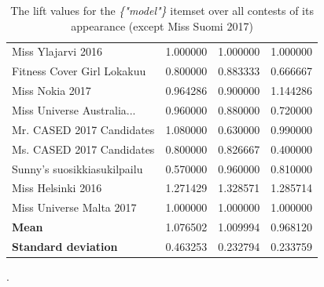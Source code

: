 \documentclass[english]{tktltiki}
\begin{document}
\begin{table}[H]
\begin{adjustbox}{width=1\textwidth}
\begin{tabular}{lccc}
                                Miss Ylajarvi 2016 &  1.000000 &  1.000000 &    1.000000 \\
                        Fitness Cover Girl Lokakuu &  0.800000 &  0.883333 &    0.666667 \\
                                   Miss Nokia 2017 &  0.964286 &  0.900000 &    1.144286 \\
                        Miss Universe Australia... &  0.960000 &  0.880000 &    0.720000 \\
                         Mr. CASED 2017 Candidates &  1.080000 &  0.630000 &    0.990000 \\
                         Ms. CASED 2017 Candidates &  0.800000 &  0.826667 &    0.400000 \\
                       Sunny's suosikkiasukilpailu &  0.570000 &  0.960000 &    0.810000 \\
                                Miss Helsinki 2016 &  1.271429 &  1.328571 &    1.285714 \\
                          Miss Universe Malta 2017 &  1.000000 &  1.000000 &    1.000000 \\
        \bottomrule
        \textbf{Mean} & 1.076502 & 1.009994 & 0.968120 \\
        \textbf{Standard deviation} & 0.463253 & 0.232794 & 0.233759
    \end{tabular}
    \end{adjustbox}
    \caption{The lift values for the \emph{\{"model"\}} itemset over all contests of its appearance (except Miss Suomi 2017)}.
    \label{model_itemset_lift_observations}
\end{table}
\end{document}
